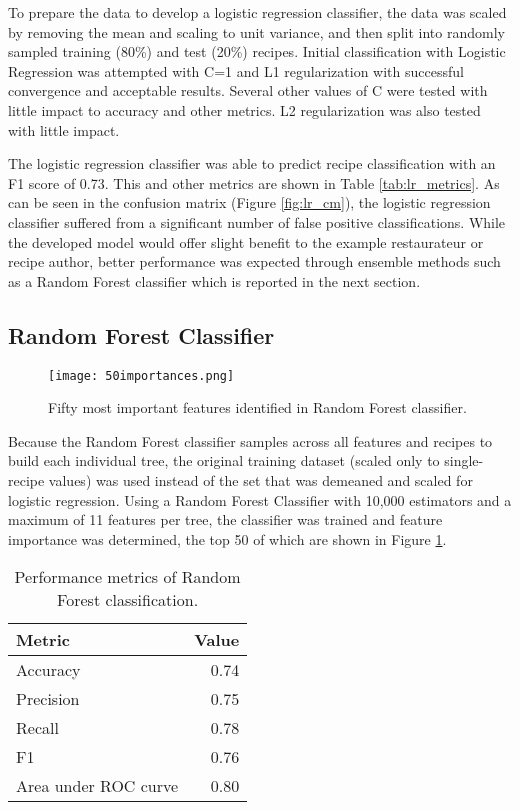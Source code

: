 \documentclass[]{scrartcl}
\begin{document}
To prepare the data to develop a logistic regression classifier, the data was scaled by removing the mean and scaling to unit variance, and then split into randomly sampled training (80\%) and test (20\%) recipes.  Initial classification with Logistic Regression was attempted with C=1 and L1 regularization with successful convergence and acceptable results. Several other values of C were tested with little impact to accuracy and other metrics. L2 regularization was also tested with little impact. 



The logistic regression classifier was able to predict recipe classification with an F1 score of 0.73.  This and other metrics are shown in Table \ref{tab:lr_metrics}.  As can be seen in the confusion matrix (Figure \ref{fig:lr_cm}), the logistic regression classifier suffered from a significant number of false positive classifications.  While the developed model would offer slight benefit to the example restaurateur or recipe author, better performance was expected through ensemble methods such as a Random Forest classifier which is reported in the next section.  

\subsection*{Random Forest Classifier}
\begin{figure}
	\centering
	\texttt{[image: 50importances.png]}
	\caption{Fifty most important features identified in Random Forest classifier.\label{fig:50imp}}
\end{figure}

Because the Random Forest classifier samples across all features and recipes to build each individual tree, the original training dataset (scaled only to single-recipe values) was used instead of the set that was demeaned and scaled for logistic regression.  Using a Random Forest Classifier with 10,000 estimators and a maximum of 11 features per tree, the classifier was trained and feature importance was determined, the top 50 of which are shown in Figure \ref{fig:50imp}. 

\begin{table}
	\centering
	\caption{Performance metrics of Random Forest classification. \label{tab:rf_metrics}}
	\begin{tabular}{lr}
		\textbf{Metric} & \textbf{Value} \\
		\hline
		Accuracy &  0.74 \\
		Precision & 0.75 \\
		Recall & 0.78 \\
		F1 & 0.76 \\
		Area under ROC curve & 0.80 \\	
	\end{tabular}
\end{table}
\end{document}
